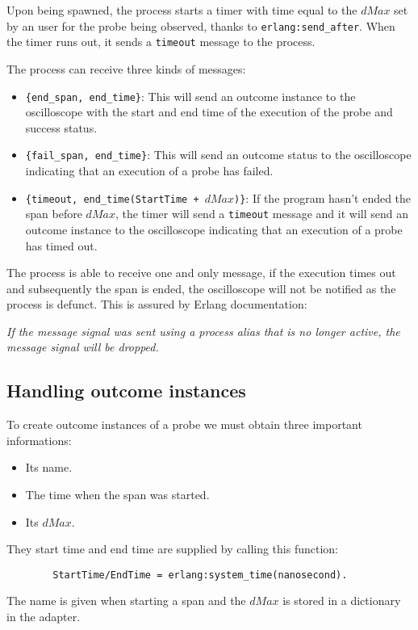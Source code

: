             Upon being spawned, the process starts a timer with time equal to the $dMax$ set by an user for the probe being observed, thanks to \texttt{erlang:send\_after}. When the timer runs out, it sends a \texttt{timeout} message to the process.
        
        The process can receive three kinds of messages:
        \begin{itemize}
            \item \texttt{\{end\_span, end\_time\}}: This will send an outcome instance to the oscilloscope with the start and end time of the execution of the probe and success status.
            \item \texttt{\{fail\_span, end\_time\}}: This will send an outcome status to the oscilloscope indicating that an execution of a probe has failed.
            \item \texttt{\{timeout, end\_time(StartTime + $dMax$)\}}: If the program hasn't ended the span before $dMax$, the timer will send a \texttt{timeout} message and it will send an outcome instance to the oscilloscope indicating that an execution of a probe has timed out.
        \end{itemize}
        The process is able to receive one and only message, if the execution times out and subsequently the span is ended, the oscilloscope will not be notified as the process is defunct. This is assured by Erlang documentation:
        \begin{center}
            \textit{If the message signal was sent using a process alias that is no longer active, the message signal will be dropped.} \cite{erl-s}
        \end{center}

    \subsection{Handling outcome instances}
        To create outcome instances of a probe we must obtain three important informations:
        \begin{itemize}
            \item Its name.
            \item The time when the span was started.
            \item Its $dMax$.
        \end{itemize}
        
        They start time and end time are supplied by calling this function:
        \begin{verbatim}
        StartTime/EndTime = erlang:system_time(nanosecond).
        \end{verbatim}
        The name is given when starting a span and the $dMax$ is stored in a dictionary in the adapter. 

